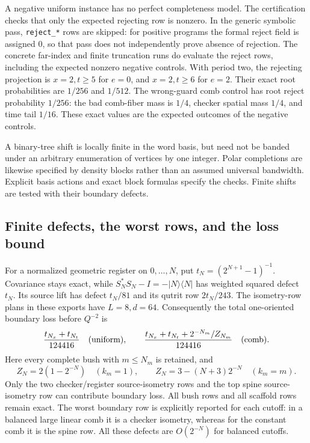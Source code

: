 A negative uniform instance has no perfect completeness model.
The certification checks that only the expected rejecting row is nonzero. In the generic symbolic pass,
\texttt{reject\_*} rows are skipped: for positive programs the formal
reject field is assigned $0$, so that pass does not independently
prove absence of rejection. The concrete far-index and finite
truncation runs do evaluate the reject rows, including the expected
nonzero negative controls. With period two, the rejecting projection
is $x=2,t\ge5$ for $e=0$, and $x=2,t\ge6$ for $e=2$. Their exact
root probabilities are $1/256$ and $1/512$. The wrong-guard comb
control has root reject probability $1/256$: the bad comb-fiber mass
is $1/4$, checker spatial mass $1/4$, and time tail $1/16$.
These exact values are the expected outcomes of the negative controls.

A binary-tree shift is locally finite in the word basis, but need not
be banded under an arbitrary enumeration of vertices by one integer.
Polar completions are likewise specified by density blocks rather
than an assumed universal bandwidth. Explicit basis actions and exact
block formulas specify the checks. Finite shifts are tested with their boundary defects.

\subsection{Finite defects, the worst rows, and the loss bound}
For a normalized geometric register on $0,\ldots,N$, put
$t_N=(2^{N+1}-1)^{-1}$. Covariance stays exact, while
$S_N^*S_N-I=-|N\rangle\langle N|$ has weighted squared defect $t_N$.
Its source lift has defect $t_N/81$ and its qutrit row $2t_N/243$.
The isometry-row plans in these exports have $L=8,d=64$. Consequently
the total one-oriented boundary loss before $Q^{-2}$ is
\begin{equation}
 \frac{t_{N_x}+t_{N_t}}{124416}\quad\hbox{(uniform)},\qquad
 \frac{t_{N_x}+t_{N_t}+2^{-N_m}/Z_{N_m}}{124416}
                                      \quad\hbox{(comb)}.    \label{eq:validation-V4}
\end{equation}
Here every complete bush with $m\le N_m$ is retained, and
\[
 Z_N=2(1-2^{-N})\quad(k_m=1),\qquad
 Z_N=3-(N+3)2^{-N}\quad(k_m=m).
\]
Only the two checker/register source-isometry rows and the top spine
source-isometry row can contribute boundary loss. All bush rows and
all scaffold rows remain exact. The worst boundary row is explicitly
reported for each cutoff: in a balanced large linear comb it is a
checker isometry, whereas for the constant comb it is the spine row.
All these defects are $O(2^{-N})$ for balanced cutoffs.

